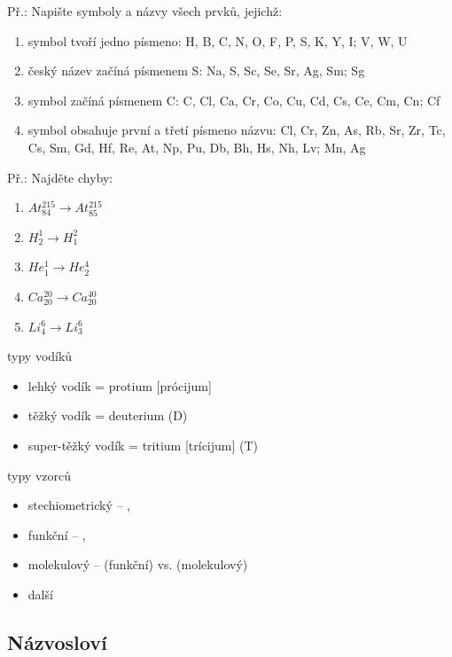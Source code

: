 \documentclass{article}
\begin{document}
Př.: Napište symboly a názvy všech prvků, jejichž:
  \begin{enumerate}
    \item symbol tvoří jedno písmeno: H, B, C, N, O, F, P, S, K, Y, I; V, W, U
    \item český název začíná písmenem S: Na, S, Sc, Se, Sr, Ag, Sm; Sg
    \item symbol začíná písmenem C: C, Cl, Ca, Cr, Co, Cu, Cd, Cs, Ce, Cm, Cn; Cf
    \item symbol obsahuje první a třetí písmeno názvu: Cl, Cr, Zn, As, Rb, Sr, Zr, Tc, Cs, Sm, Gd, Hf, Re, At, Np, Pu, Db, Bh, Hs, Nh, Lv; Mn, Ag
  \end{enumerate}


Př.: Najděte chyby:
  \begin{enumerate}
    \item $At^{215}_{84} \rightarrow At^{215}_{85}$
    \item $H^1_2 \rightarrow H^2_1$
    \item $He^1_1 \rightarrow He^4_2$
    \item $Ca^{20}_{20} \rightarrow Ca^{40}_{20}$
    \item $Li^6_4 \rightarrow Li^6_3$
  \end{enumerate}

typy vodíků
\begin{itemize}
  \item lehký vodík = protium [prócijum]
  \item těžký vodík = deuterium (D)
  \item super-těžký vodík = tritium [trícijum] (T)
\end{itemize}

typy vzorců
\begin{itemize}
  \item stechiometrický -- , 
  \item funkční -- , 
  \item molekulový --  (funkční) vs.  (molekulový)
  \item další
\end{itemize}

\subsection{Názvosloví}
\end{document}
